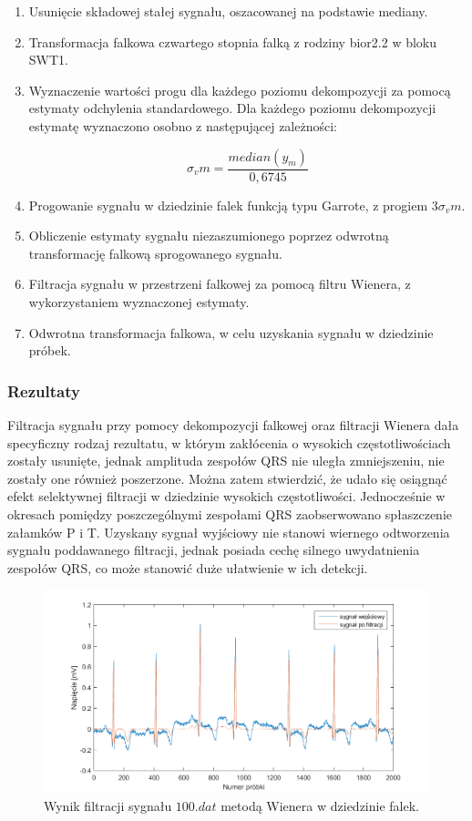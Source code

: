\documentclass[a4paper]{article}
\begin{document}
\begin{enumerate}
\item Usunięcie składowej stałej sygnału, oszacowanej na podstawie mediany. 
\item Transformacja falkowa czwartego stopnia falką z rodziny bior2.2 w bloku SWT1.
\item Wyznaczenie wartości progu dla każdego poziomu dekompozycji za pomocą estymaty odchylenia standardowego. Dla każdego poziomu dekompozycji estymatę wyznaczono osobno z następującej zależności:

\begin{equation} 
\sigma_vm=\frac{median(y_m)}{0,6745}
\end{equation}

\item Progowanie sygnału w dziedzinie falek funkcją typu Garrote, z progiem $3 \sigma_vm$.
\item Obliczenie estymaty sygnału niezaszumionego poprzez odwrotną transformację falkową sprogowanego sygnału.
\item Filtracja sygnału w przestrzeni falkowej za pomocą filtru Wienera, z wykorzystaniem wyznaczonej estymaty. 
\item Odwrotna transformacja falkowa, w celu uzyskania sygnału w dziedzinie próbek.
\end{enumerate}

\subsubsection{Rezultaty}
	
Filtracja sygnału przy pomocy dekompozycji falkowej oraz filtracji Wienera dała specyficzny rodzaj rezultatu, w którym zakłócenia o wysokich częstotliwościach zostały usunięte, jednak amplituda zespołów QRS nie uległa zmniejszeniu, nie zostały one również poszerzone. Można zatem stwierdzić, że udało się osiągnąć efekt selektywnej filtracji w dziedzinie wysokich częstotliwości. Jednocześnie w okresach pomiędzy poszczególnymi zespołami QRS zaobserwowano spłaszczenie załamków P i T. Uzyskany sygnał wyjściowy nie stanowi wiernego odtworzenia sygnału poddawanego filtracji, jednak posiada cechę silnego uwydatnienia zespołów QRS, co może stanowić duże ułatwienie w ich detekcji.
    
\begin{figure}[H]
\centering
\includegraphics[width=1\textwidth]{wwf/wynik}
\caption{\label{wwf/wynik} Wynik filtracji sygnału $100.dat
$ metodą Wienera w dziedzinie falek.}
\end{figure}
\end{document}
